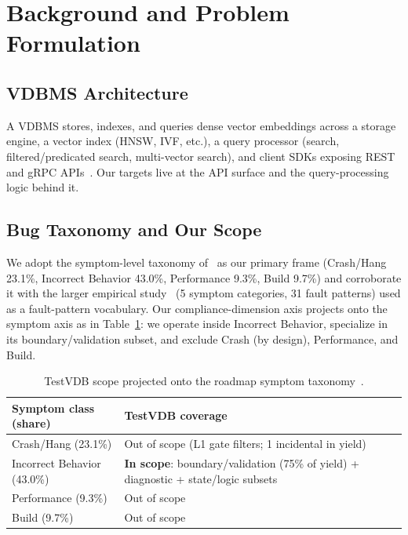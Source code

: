 \documentclass[sigconf]{acmart}
\begin{document}
\section{Background and Problem Formulation}\label{sec:bg}

\subsection{VDBMS Architecture}
A VDBMS stores, indexes, and queries dense vector embeddings across a storage engine, a vector index (HNSW, IVF, etc.), a query processor (search, filtered/predicated search, multi-vector search), and client SDKs exposing REST and gRPC APIs~\cite{roadmap25}. Our targets live at the API surface and the query-processing logic behind it.

\subsection{Bug Taxonomy and Our Scope}
We adopt the symptom-level taxonomy of~\cite{roadmap25} as our primary frame (Crash/Hang 23.1\%, Incorrect Behavior 43.0\%, Performance 9.3\%, Build 9.7\%) and corroborate it with the larger empirical study~\cite{bugstudy25} (5 symptom categories, 31 fault patterns) used as a fault-pattern vocabulary. Our compliance-dimension axis projects onto the symptom axis as in Table~\ref{tab:scope}: we operate inside Incorrect Behavior, specialize in its boundary/validation subset, and exclude Crash (by design), Performance, and Build.

\begin{table}[t]
\caption{TestVDB scope projected onto the roadmap symptom taxonomy~\cite{roadmap25}.}
\label{tab:scope}
\small
\begin{tabular}{@{}p{}p{}@{}}
\toprule
Symptom class (share) & TestVDB coverage \\
\midrule
Crash/Hang (23.1\%) & Out of scope (L1 gate filters; 1 incidental in yield) \\
Incorrect Behavior (43.0\%) & \textbf{In scope}: boundary/validation (75\% of yield) + diagnostic + state/logic subsets \\
Performance (9.3\%) & Out of scope \\
Build (9.7\%) & Out of scope \\
\bottomrule
\end{tabular}
\end{table}
\end{document}
